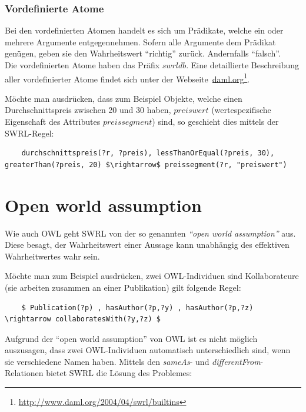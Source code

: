 \subsubsection{Vordefinierte Atome}
\label{ssubsec:swrl_aufbau_atomaretypen_vordefinierteatome}
Bei den vordefinierten Atomen handelt es sich um Prädikate, welche ein oder mehrere Argumente entgegennehmen. Sofern alle Argumente dem Prädikat genügen, geben sie den Wahrheitswert ``richtig'' zurück. Andernfalls ``falsch''.\\
Die vordefinierten Atome haben das Präfix $swrldb$. Eine detaillierte Beschreibung aller vordefinierter Atome findet sich unter der Webseite~\href{http://www.daml.org/2004/04/swrl/builtins}{daml.org}\footnote{\url{http://www.daml.org/2004/04/swrl/builtins}}.

Möchte man ausdrücken, dass zum Beispiel Objekte, welche einen Durchschnittspreis zwischen 20 und 30 haben, $preiswert$ (wertespezifische Eigenschaft des Attributes $preissegment$) sind, so geschieht dies mittels der SWRL-Regel:
\lstset{language=XML}
\begin{lstlisting}
    durchschnittspreis(?r, ?preis), lessThanOrEqual(?preis, 30), greaterThan(?preis, 20) $\rightarrow$ preissegment(?r, "preiswert")
\end{lstlisting}

\newpage

\section{Open world assumption}
\label{sec:swrl_openworldassumption}
Wie auch OWL geht SWRL von der so genannten \textit{``open world assumption''} aus. Diese besagt, der Wahrheitswert einer Aussage kann unabhängig des effektiven Wahrheitwertes wahr sein.

Möchte man zum Beispiel ausdrücken, zwei OWL-Individuen sind Kollaborateure (sie arbeiten zusammen an einer Publikation) gilt folgende Regel:

\lstset{language=XML}
\begin{lstlisting}
    $ Publication(?p) , hasAuthor(?p,?y) , hasAuthor(?p,?z) \rightarrow collaboratesWith(?y,?z) $
\end{lstlisting}

Aufgrund  der ``open world assumption'' von OWL ist es nicht möglich auszusagen, dass zwei OWL-Individuen automatisch unterschiedlich sind, wenn sie verschiedene Namen haben. Mittels den \textit{sameAs}- und \textit{differentFrom}-Relationen bietet SWRL die Lösung des Problemes:

